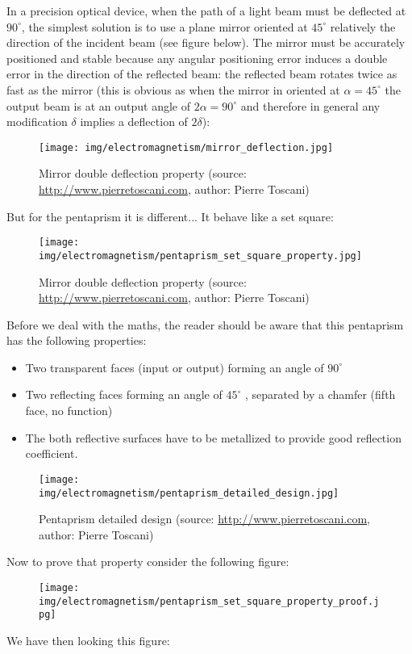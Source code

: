 	In a precision optical device, when the path of a light beam must be deflected at $90^\circ$, the simplest solution is to use a plane mirror oriented at $45^\circ$ relatively the direction of the incident beam (see figure below). The mirror must be accurately positioned and stable because any angular positioning error induces a double error in the direction of the reflected beam: the reflected beam rotates twice as fast as the mirror (this is obvious as when the mirror in oriented at $\alpha=45^\circ$ the output beam is at an output angle of $2\alpha=90^\circ$ and therefore in general any modification $\delta$ implies a deflection of $2\delta$):
	\begin{figure}[H]
		\centering
		\texttt{[image: img/electromagnetism/mirror\_deflection.jpg]}
		\caption[Mirror double deflection property]{Mirror double deflection property (source: \url{http://www.pierretoscani.com}, author: Pierre Toscani)}
	\end{figure}
	But for the pentaprism it is different... It behave like a set square:
	\begin{figure}[H]
		\centering
		\texttt{[image: img/electromagnetism/pentaprism\_set\_square\_property.jpg]}
		\caption[Mirror double deflection property]{Mirror double deflection property (source: \url{http://www.pierretoscani.com}, author: Pierre Toscani)}
	\end{figure}
	Before we deal with the maths, the reader should be aware that this pentaprism has the following properties:
	 \begin{itemize}
		\item Two transparent faces (input or output) forming an angle of $90^\circ$
		 \item Two reflecting faces forming an angle of $45^\circ$ , separated by a chamfer (fifth face, no function)
		\item The both reflective surfaces have to be metallized to provide good reflection coefficient.
	\end{itemize} 
	\begin{figure}[H]
		\centering
		\texttt{[image: img/electromagnetism/pentaprism\_detailed\_design.jpg]}
		\caption[Pentaprism detailed design]{Pentaprism detailed design (source: \url{http://www.pierretoscani.com}, author: Pierre Toscani)}
	\end{figure}
	Now to prove that property consider the following figure:
	\begin{figure}[H]
		\centering
		\texttt{[image: img/electromagnetism/pentaprism\_set\_square\_property\_proof.jpg]}
	\end{figure}
	We have then looking this figure:
	
